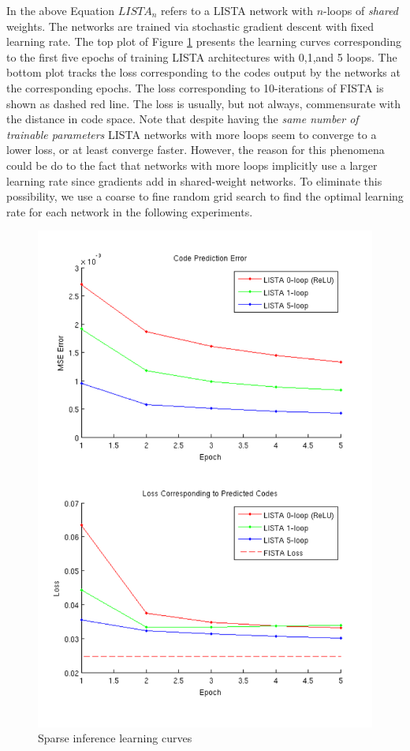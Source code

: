 In the above Equation $LISTA_n$ refers to a LISTA network with $n$-loops of
\emph{shared} weights. The networks are trained via stochastic gradient descent
with fixed learning rate. The top plot of Figure \ref{fig:learning_curves}
presents the learning curves corresponding to the first five epochs of training
LISTA architectures with 0,1,and 5 loops. The bottom plot tracks the loss
corresponding to the codes output by the networks at the corresponding epochs.
The loss corresponding to 10-iterations of FISTA is shown as dashed red line. 
The loss is usually, but not always, commensurate with the distance in code
space. Note that despite having the \emph{same number of trainable parameters}
LISTA networks with more loops seem to converge to a lower loss, or at least
converge faster.  However, the reason for this phenomena could be do to the
fact that networks with more loops implicitly use a larger learning rate since
gradients add in shared-weight networks. To eliminate this possibility, we use
a coarse to fine random grid search to find the optimal learning rate for each
network in the following experiments.

\begin{figure} \centering
\includegraphics[scale=0.75]{./figures/LISTA/code_pred.pdf} \caption{Sparse
inference learning curves} \label{fig:learning_curves} \end{figure}  


